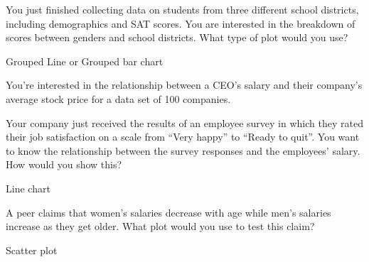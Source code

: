\documentclass[11pt]{exam}
\begin{document}
\headrule 
\cfoot{\thepage}

\begin{questions}

  \question You just finished collecting data on students from three
  different school districts, including demographics and SAT scores.  You
  are interested in the breakdown of scores between genders and school
  districts.  What type of plot would you use?
    \begin{solution}
      Grouped Line or Grouped bar chart
    \end{solution}

  \question You're interested in the relationship between a CEO's salary
  and their company's average stock price for a data set of 100 companies.

  \question Your company just received the results of an employee survey in
  which they rated their job satisfaction on a scale from ``Very happy'' to
  ``Ready to quit''. You want to know the relationship between the survey
  responses and the employees' salary.  How would you show this?
    \begin{solution}
      Line chart
    \end{solution}

  \question A peer claims that women's salaries decrease with age while
  men's salaries increase as they get older.  What plot would you use to
  test this claim?
    \begin{solution}
      Scatter plot
    \end{solution}


\end{questions}
\end{document}
